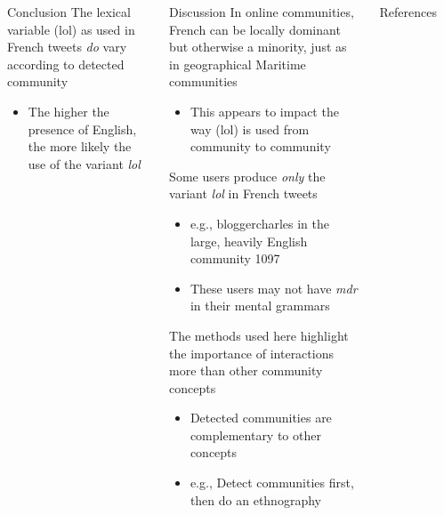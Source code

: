 \documentclass{beamer}\usepackage[]{graphicx}\usepackage[]{color}
\newcommand{\lexi}[1]{\textit{#1}}
\begin{document}
\begin{frame}
\begin{columns}[t]
\begin{columns}
\begin{block}{}
            \end{block}
        \end{columns}

        \begin{block}{Conclusion}
          The lexical variable (lol) as used in French tweets \emph{do} vary according to detected community
          \begin{itemize}
            \item The higher the presence of English, the more likely the use of the variant \lexi{lol}
          \end{itemize}
        \end{block}

        \begin{block}{Discussion}
          In online communities, French can be locally dominant but otherwise a minority, just as in geographical Maritime communities
          \begin{itemize}
            \item This appears to impact the way (lol) is used from community to community
          \end{itemize}
          Some users produce \emph{only} the variant \lexi{lol} in French tweets
          \begin{itemize}
            \item e.g., bloggercharles in the large, heavily English community 1097
            \item These users may not have \lexi{mdr} in their mental grammars
          \end{itemize}
          The methods used here highlight the importance of interactions more than other community concepts
          \begin{itemize}
            \item Detected communities are complementary to other concepts
            \item e.g., Detect communities first, then do an ethnography
          \end{itemize}
        \end{block}

        \begin{block}{References}
          \printbibliography
        \end{block}
    \end{columns}
  \end{frame}
\end{document}
